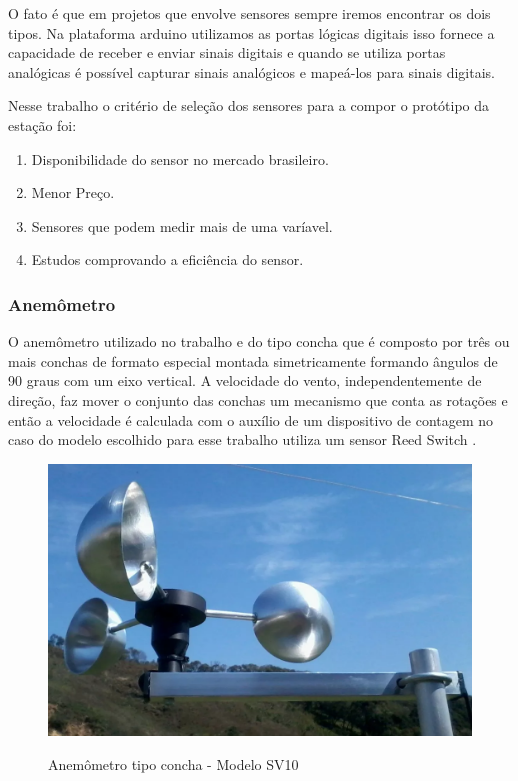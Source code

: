 O fato é que em projetos que envolve sensores sempre iremos encontrar os dois tipos. Na plataforma arduino utilizamos as portas lógicas digitais isso fornece a capacidade de receber e enviar sinais digitais e quando se utiliza portas analógicas é possível capturar sinais analógicos e mapeá-los para sinais digitais.

Nesse trabalho o critério de seleção dos sensores para a compor o protótipo da estação foi: 
 \begin{enumerate}
   \item Disponibilidade do sensor no mercado brasileiro.
   \item Menor Preço.
   \item Sensores que podem medir mais de uma varíavel.
   \item Estudos comprovando a eficiência do sensor.
 \end{enumerate}

\subsubsection {Anemômetro}

O anemômetro utilizado no trabalho e do tipo concha que é composto por três ou mais conchas de formato especial montada simetricamente formando ângulos de 90 graus com um eixo vertical. A velocidade do vento, independentemente de direção, faz mover o conjunto das conchas um mecanismo que conta as rotações e então a velocidade é calculada com o auxílio de um dispositivo de contagem no caso do modelo escolhido para esse trabalho utiliza um sensor Reed Switch \cite{USINAINFOBLOG}.

\begin{figure} [!h]
    \centering
    \caption{Anemômetro tipo concha - Modelo SV10}
    \includegraphics[scale=0.25]{Figuras/ane_SV10.png}
    \label{fig:anemometro}
\end{figure}

